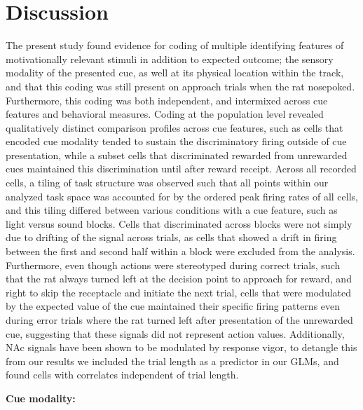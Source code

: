 \documentclass[11pt]{article}
\begin{document}
\section*{Discussion}

The present study found evidence for coding of multiple identifying features of motivationally relevant stimuli in addition to expected outcome; the sensory modality of the presented cue, as well at its physical location within the track, and that this coding was still present on approach trials when the rat nosepoked. Furthermore, this coding was both independent, and intermixed across cue features and behavioral measures. Coding at the population level revealed qualitatively distinct comparison profiles across cue features, such as cells that encoded cue modality tended to sustain the discriminatory firing outside of cue presentation, while a subset cells that discriminated rewarded from unrewarded cues maintained this discrimination until after reward receipt. Across all recorded cells, a tiling of task structure was observed such that all points within our analyzed task space was accounted for by the ordered peak firing rates of all cells, and this tiling differed between various conditions with a cue feature, such as light versus sound blocks. Cells that discriminated across blocks were not simply due to drifting of the signal across trials, as cells that showed a drift in firing between the first and second half within a block were excluded from the analysis. Furthermore, even though actions were stereotyped during correct trials, such that the rat always turned left at the decision point to approach for reward, and right to skip the receptacle and initiate the next trial, cells that were modulated by the expected value of the cue maintained their specific firing patterns even during error trials where the rat turned left after presentation of the unrewarded cue, suggesting that these signals did not represent action values. Additionally, NAc signals have been shown to be modulated by response vigor, to detangle this from our results we included the trial length as a predictor in our GLMs, and found cells with correlates independent of trial length.

{\bf Cue modality:}  
\end{document}
